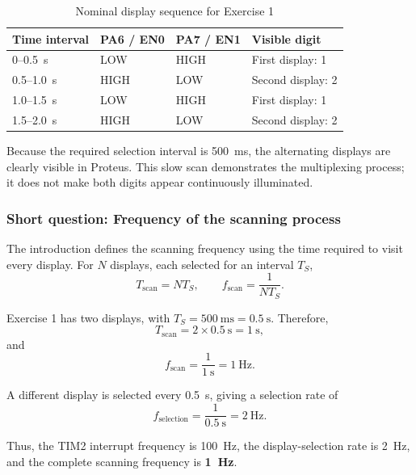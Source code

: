 \documentclass[a4paper]{article}
\begin{document}
\begin{table}[H]
    \centering
    \caption{Nominal display sequence for Exercise 1}
    \label{tab:ex01-sequence}
    \begin{tabular}{llll}
        \toprule
        \textbf{Time interval} &
        \textbf{PA6 / EN0} &
        \textbf{PA7 / EN1} &
        \textbf{Visible digit} \\
        \midrule
        0--0.5~s   & LOW  & HIGH & First display: 1 \\
        0.5--1.0~s & HIGH & LOW  & Second display: 2 \\
        1.0--1.5~s & LOW  & HIGH & First display: 1 \\
        1.5--2.0~s & HIGH & LOW  & Second display: 2 \\
        \bottomrule
    \end{tabular}
\end{table}

Because the required selection interval is 500~ms,
the alternating displays are clearly visible in
Proteus. This slow scan demonstrates the multiplexing
process; it does not make both digits appear
continuously illuminated.

\subsubsection{Short question: Frequency of the scanning process}

The introduction defines the scanning frequency
using the time required to visit every display.
For $N$ displays, each selected for an interval $T_S$,
\[
    T_{\mathrm{scan}} = N T_S,
    \qquad
    f_{\mathrm{scan}} = \frac{1}{N T_S}.
\]

Exercise 1 has two displays, with
$T_S = 500~\mathrm{ms} = 0.5~\mathrm{s}$. Therefore,
\[
    T_{\mathrm{scan}}
    = 2 \times 0.5~\mathrm{s}
    = 1~\mathrm{s},
\]
and
\[
    \boxed{
        f_{\mathrm{scan}}
        = \frac{1}{1~\mathrm{s}}
        = 1~\mathrm{Hz}
    }.
\]

A different display is selected every 0.5~s,
giving a selection rate of
\[
    f_{\mathrm{selection}}
    = \frac{1}{0.5~\mathrm{s}}
    = 2~\mathrm{Hz}.
\]

Thus, the TIM2 interrupt frequency is 100~Hz,
the display-selection rate is 2~Hz, and the
complete scanning frequency is \textbf{1~Hz}.

\end{document}
